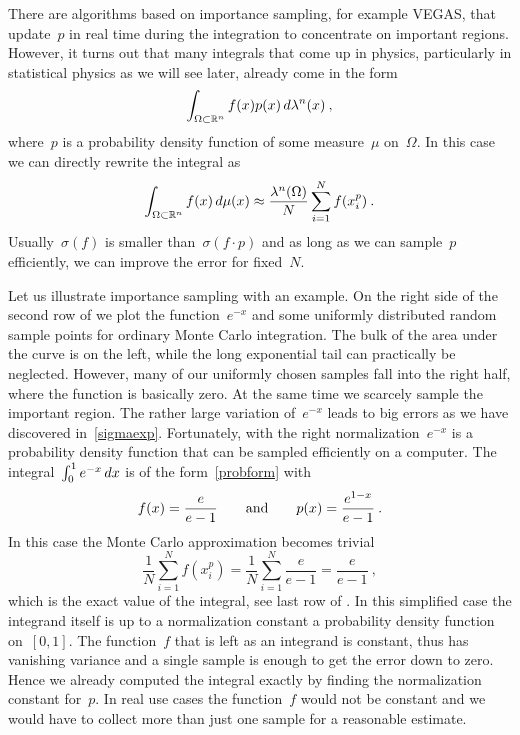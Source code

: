 There are algorithms based on importance sampling, for example VEGAS, that
update~$p$ in real time during the integration to concentrate on important
regions. However, it turns out that many integrals that come up in physics,
particularly in statistical physics as we will see later, already come in the
form
%
\begin{equation}\label{probform}
  \int_{\Omega \subset \mathbb{R}^n} f(x) p(x) \,d\lambda^n(x)\:,
\end{equation}
%
where~$p$ is a probability density function of some measure~$\mu$ on~$\Omega$.
In this case we can directly rewrite the integral as
%
\begin{equation}
  \int_{\Omega \subset \mathbb{R}^n} f(x) \,d\mu(x) \approx
  \frac{\lambda^n(\Omega)}{N} \sum_{i=1}^N {f(x_i^p)}\:.
\end{equation}
%
Usually~$\sigma(f)$ is smaller than~$\sigma(f\cdot p)$ and as long as we can
sample~$p$ efficiently, we can improve the error for fixed~$N$.

Let us illustrate importance sampling with an example. On the right side of the
second row of  we plot the function~$e^{-x}$ and some
uniformly distributed random sample points for ordinary Monte Carlo integration.
The bulk of the area under the curve is on the left, while the long exponential
tail can practically be neglected. However, many of our uniformly chosen samples
fall into the right half, where the function is basically zero. At the same
time we scarcely sample the important region. The rather large variation
of~$e^{-x}$ leads to big errors as we have discovered in~\eqref{sigmaexp}.
Fortunately, with the right normalization~$e^{-x}$ is a probability density
function that can be sampled efficiently on a computer. The integral~$\int_0^1
e^{-x} \,dx$ is of the form~\eqref{probform} with
%
\begin{equation}
  f(x) =\frac{e}{e-1} \qquad\text{and}\qquad p(x) =\frac{e^{1-x}}{e-1}\:.
\end{equation}
%
In this case the Monte Carlo approximation becomes trivial
%
\begin{equation}
  \frac{1}{N} \sum_{i=1}^N f(x_i^p) = \frac{1}{N} \sum_{i=1}^N \frac{e}{e-1} =
  \frac{e}{e-1} \:,
\end{equation}
%
which is the exact value of the integral, see last row of . In
this simplified case the integrand itself is up to a normalization constant a
probability density function on~$[0,1]$. The function~$f$ that is left as an
integrand is constant, thus has vanishing variance and a single sample is enough
to get the error down to zero. Hence we already computed the integral exactly by
finding the normalization constant for~$p$. In real use cases the function~$f$
would not be constant and we would have to collect more than just one sample for
a reasonable estimate.

